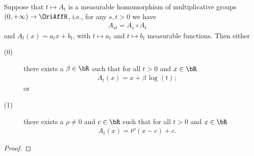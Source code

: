 \begin{theorem}
  \label{thm:one-parameter-subgroups-of-affine-isomorphisms}
  Suppose that $t \mapsto A_t$ is a measurable homomorphism of multiplicative groups
  $(0,+\infty) \to \OriAffR$, i.e., for any $s, t > 0$ we have
  \begin{align*}
    A_{s t} = A_s \circ A_t
  \end{align*}
  and $A_t(x) = a_t x + b_t$, with $t \mapsto a_t$ and $t \mapsto b_t$
  measurable functions.
  Then either
  \begin{description}
    \item[(0)] there exists a $\beta \in \bR$ such that for all $t > 0$ and $x \in \bR$
      \begin{align*}
        A_t(x) = x + \beta \, \log(t) ;
      \end{align*}
      or
    \item[(1)] there exists a $\rho \ne 0$ and $c \in \bR$ such that
      for all $t > 0$ and $x \in \bR$
      \begin{align*}
        A_t(x) = t^{\rho} (x - c) + c .
      \end{align*}
  \end{description}
\end{theorem}
\begin{proof}
\end{proof}
